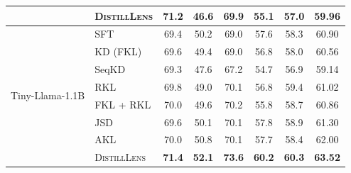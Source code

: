 \begin{table}[!t]
\begin{tabular}{ll|c|c|c|c|c||c}
     & \textsc{DistillLens} & \textbf{71.2} & \textbf{46.6} & \textbf{69.9} & \textbf{55.1} & \textbf{57.0} & \textbf{59.96} \\
    \midrule
    \multirow{8}{*}{Tiny-Llama-1.1B}
        & SFT & 69.4 & 50.2 & 69.0 & 57.6 & 58.3 & 60.90  \\
     & KD (FKL) &  69.6 & 49.4 & 69.0 & 56.8 & 58.0  & 60.56  \\
     & SeqKD &  69.3 & 47.6 & 67.2 & 54.7 & 56.9 & 59.14    \\
     & RKL & 69.8 & 49.0 & 70.1 & 56.8 & 59.4 & 61.02 \\
     & FKL + RKL & 70.0 & 49.6 & 70.2 & 55.8 & 58.7 & 60.86 \\
     & JSD & 69.6 & 50.1 & 70.1 & 57.8 & 58.9 & 61.30 \\
     & AKL & 70.0 & 50.8 & 70.1 & 57.7 & 58.4 & 62.00 \\
     & \textsc{DistillLens} & \textbf{71.4} & \textbf{52.1} & \textbf{73.6} & \textbf{60.2} & \textbf{60.3} & \textbf{63.52} \\
     \bottomrule
    \end{tabular}
    \vspace{0.4cm}
    \vspace{-0.5cm}
    \label{tab:results}
\end{table}